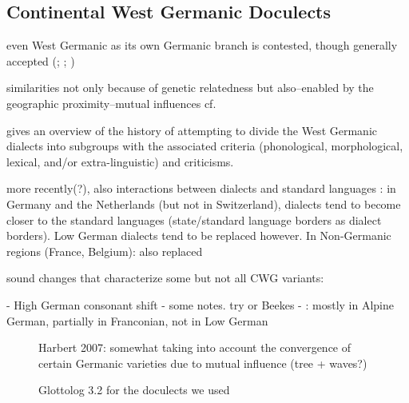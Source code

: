 \documentclass[a4paper]{article}
\begin{document}
\subsection{Continental West Germanic Doculects}

even West Germanic as its own Germanic branch is contested, though generally accepted (\citet{voyles1971problem}; \citet[pp. 7-8]{harbert2007germanic}; \citet{ringe2012cladistic}) %

similarities not only because of genetic relatedness but also--enabled by the geographic proximity--mutual influences
cf. \citet[p. 8]{harbert2007germanic}

\citet[pp. 72-80]{nielsen1989germanic} gives an overview of the history of attempting to divide the West Germanic dialects into subgroups with the associated criteria (phonological, morphological, lexical, and/or extra-linguistic) and criticisms.

more recently(?), also interactions between dialects and standard languages \citep{coetsem1992interaction}
\citet{kremer1990einfuehrung}: in Germany and the Netherlands (but not in Switzerland), dialects tend to become closer to the standard languages (state/standard language borders as dialect borders). Low German dialects tend to be replaced however. In Non-Germanic regions (France, Belgium): also replaced

sound changes that characterize some but not all CWG variants:

- High German consonant shift
  - some notes. try \citet[pp. 47-48]{harbert2007germanic} or Beekes
  - \citet[p. 15]{harbert2007germanic}: mostly in Alpine German, partially in Franconian, not in Low German


\begin{figure}
\centering

\caption{Harbert 2007: somewhat taking into account the convergence of certain Germanic varieties due to mutual influence (tree + waves?)}
\label{fig:cwg_harbert}
\end{figure}


\begin{figure}
\begin{adjustwidth}{-3cm}{-3cm}
\centering
\scalebox{0.8}{

}
\end{adjustwidth}
% 
\caption{Glottolog 3.2 for the doculects we used}
\end{figure}
\end{document}
